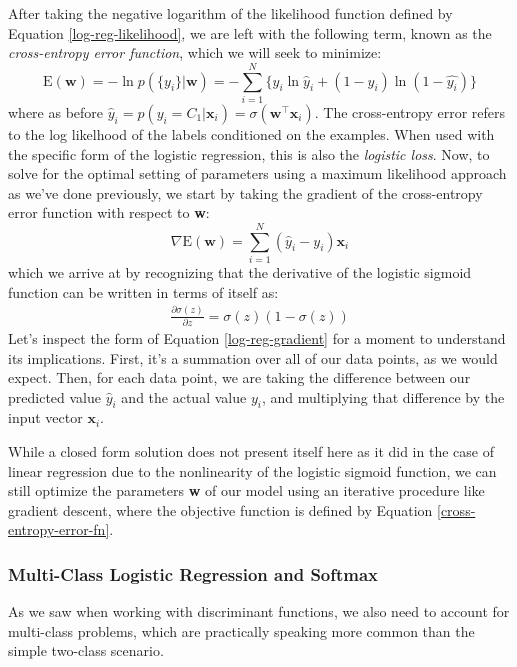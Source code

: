 After taking the negative logarithm of the likelihood function defined by Equation \ref{log-reg-likelihood}, we are left with the following term, known as the \textit{cross-entropy error function}, which we will seek to minimize:
\begin{equation} \label{cross-entropy-error-fn}
	\mathrm{E}(\textbf{w}) = - \ln{p(\{y_{i}\}|\textbf{w})} = - \sum_{i=1}^{N} \{y_{i}\ln{\hat{y}_i} + (1 - y_{i})\ln{(1-\hat{y_{i}})}\}
\end{equation}
where as before $\hat{y}_{i} = p(y_{i}=C_{1}|\textbf{x}_{i}) = \sigma(\textbf{w}^\top\textbf{x}_{i})$.
The cross-entropy error refers to the  log likelhood of the labels conditioned on the examples. When used with the specific form of the logistic regression, this is also the {\em logistic loss}. 
Now, to solve for the optimal setting of parameters using a maximum likelihood approach as we've done previously, we start by taking the gradient of the cross-entropy error function with respect to \textbf{w}:
\begin{equation} \label{log-reg-gradient}
	\nabla \mathrm{E}(\textbf{w}) = \sum_{i=1}^{N}(\hat{y}_{i} - y_{i})\textbf{x}_{i}
\end{equation}
which we arrive at by recognizing that the derivative of the logistic sigmoid function can be written in terms of itself as:
\begin{align*}
	\frac{\partial \sigma(z)}{\partial z} = \sigma(z)(1 - \sigma(z))
\end{align*}
Let's inspect the form of Equation \ref{log-reg-gradient} for a moment to understand its implications. First, it's a summation over all of our data points, as we would expect. Then, for each data point, we are taking the difference between our predicted value $\hat{y}_{i}$ and the actual value $y_{i}$, and multiplying that difference by the input vector $\textbf{x}_{i}$.

While a closed form solution does not present itself here as it did in the case of linear regression due to the nonlinearity of the logistic sigmoid function, we can still optimize the parameters \textbf{w} of our model using an iterative procedure like gradient descent, where the objective function is defined by Equation \ref{cross-entropy-error-fn}.

\subsubsection{Multi-Class Logistic Regression and Softmax}
As we saw when working with discriminant functions, we also need to account for multi-class problems, which are practically speaking more common than the simple two-class scenario.

